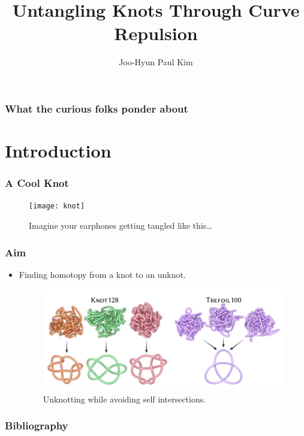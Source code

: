 \documentclass{beamer}
\title{Untangling Knots Through Curve Repulsion}
\author{Joo-Hyun Paul Kim}
\begin{document}
\begin{frame}
    \titlepage
\end{frame}

\begin{frame}
    \frametitle{What the curious folks ponder about}
    \tableofcontents
\end{frame}

\section{Introduction}
\begin{frame}
    \frametitle{A Cool Knot}
    \begin{figure}[h]
        \centering
        \texttt{[image: knot]}
        \caption{Imagine your earphones getting tangled like this\ldots}
    \end{figure}

\end{frame}
\begin{frame}
    \frametitle{Aim}
    \begin{itemize}
        \item Finding homotopy from a knot to an unknot.
            \begin{figure}[h]
                \centering
                \includegraphics[scale=0.2]{knotsolving}
                \caption{Unknotting while avoiding self intersections.\cite{YSC2021}}
            \end{figure}
    \end{itemize}

\end{frame}

\begin{frame}
    \frametitle{Bibliography}
    \printbibliography
\end{frame}
\end{document}
